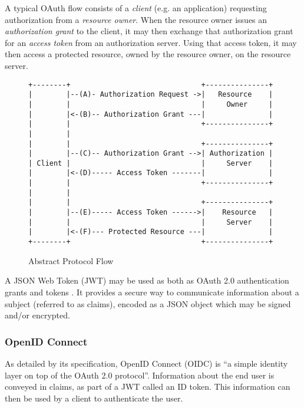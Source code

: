A typical OAuth flow consists of a \emph{client} (e.g. an application) requesting authorization from a \emph{resource owner}. When the resource owner issues an \emph{authorization grant} to the client, it may then exchange that authorization grant for an \emph{access token} from an authorization server. Using that access token, it may then access a protected resource, owned by the resource owner, on the resource server. \autocite{Hardt2023}
\begin{figure}[h]
\begin{scriptsize}
\begin{verbatim} 
+--------+                               +---------------+
|        |--(A)- Authorization Request ->|   Resource    |
|        |                               |     Owner     |
|        |<-(B)-- Authorization Grant ---|               |
|        |                               +---------------+
|        |
|        |                               +---------------+
|        |--(C)-- Authorization Grant -->| Authorization |
| Client |                               |     Server    |
|        |<-(D)----- Access Token -------|               |
|        |                               +---------------+
|        |
|        |                               +---------------+
|        |--(E)----- Access Token ------>|    Resource   |
|        |                               |     Server    |
|        |<-(F)--- Protected Resource ---|               |
+--------+                               +---------------+
\end{verbatim}
\end{scriptsize}
\caption{Abstract Protocol Flow \autocite{Hardt2023}}
\end{figure}

A JSON Web Token (JWT) may be used as both as OAuth 2.0 authentication grants and tokens \autocite{Jones2015a, Bertocci2021}. It provides a secure way to communicate information about a subject (referred to as claims), encoded as a JSON object which may be signed and/or encrypted. \autocite{Jones2015}

\subsubsection{OpenID Connect}
As detailed by its specification, OpenID Connect (OIDC) is ``a simple identity layer on top of the OAuth 2.0 protocol''. Information about the end user is conveyed in claims, as part of a JWT called an ID token. This information can then be used by a client to authenticate the user. \autocite{Sakimura2014} 

